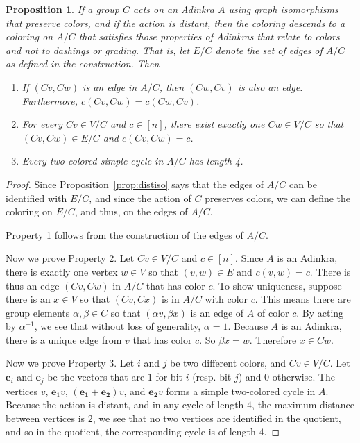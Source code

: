 \documentclass[12pt,twoside,singlespace]{article}
\numberwithin{equation}{section}
\newtheorem{prop}[equation]{Proposition}
\theoremstyle{definition}
\renewcommand{\vec}[1]{\mathbf{#1}}
\begin{document}
\begin{prop}
\label{prop:quotient}
If a group $C$ acts on an Adinkra $A$ using graph isomorphisms that preserve colors, and if the action is distant, then the coloring descends to a coloring on $A/C$ that satisfies those properties of Adinkras that relate to colors and not to dashings or grading.  That is, let $E/C$ denote the set of edges of $A/C$ as defined in the construction.  Then
\begin{enumerate}
\item If $(Cv,Cw)$ is an edge in $A/C$, then $(Cw,Cv)$ is also an edge.  Furthermore, $c(Cv,Cw)=c(Cw,Cv)$.
\item For every $Cv\in V/C$ and $c\in [n]$, there exist exactly one $Cw\in V/C$ so that $(Cv,Cw)\in E/C$ and $c(Cv,Cw)=c$.
\item Every two-colored simple cycle in $A/C$ has length 4.
\end{enumerate}
\end{prop}
\begin{proof}
Since Proposition~\ref{prop:distiso} says that the edges of $A/C$ can be identified with $E/C$, and since the action of $C$ preserves colors, we can define the coloring on $E/C$, and thus, on the edges of $A/C$.

Property 1 follows from the construction of the edges of $A/C$.

Now we prove Property 2.  Let $Cv\in V/C$ and $c\in [n]$.  Since $A$ is an Adinkra, there is exactly one vertex $w\in V$ so that $(v,w)\in E$ and $c(v,w)=c$.  There is thus an edge $(Cv,Cw)$ in $A/C$ that has color $c$.  To show uniqueness, suppose there is an $x\in V$ so that $(Cv,Cx)$ is in $A/C$ with color $c$.  This means there are group elements $\alpha,\beta\in C$ so that $(\alpha v,\beta x)$ is an edge of $A$ of color $c$.  By acting by $\alpha^{-1}$, we see that without loss of generality, $\alpha=1$.  Because $A$ is an Adinkra, there is a unique edge from $v$ that has color $c$.  So $\beta x = w$.  Therefore $x\in Cw$.

Now we prove Property 3.  Let $i$ and $j$ be two different colors, and $Cv\in V/C$.  Let $\vec{e}_i$ and $\vec{e}_j$ be the vectors that are $1$ for bit $i$ (resp. bit $j$) and $0$ otherwise.  The vertices $v$, $\vec{e}_1 v$, $(\vec{e_1}+\vec{e_2})v$, and $\vec{e_2}v$ forms a simple two-colored cycle in $A$.  Because the action is distant, and in any cycle of length $4$, the maximum distance between vertices is $2$, we see that no two vertices are identified in the quotient, and so in the quotient, the corresponding cycle is of length $4$.
\end{proof}
\end{document}
